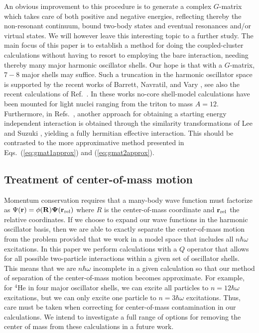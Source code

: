 \documentclass[aps,prc,twocolumn,floatfix]{revtex4}
\begin{document}
An obvious improvement to this procedure is to generate a complex $G$-matrix which takes care
of both positive and negative energies, reflecting thereby the non-resonant continuum, bound two-body
states and eventual resonances and/or virtual states. We will however leave this interesting topic
to a further study. The main focus of this paper is to establish a method for doing
the coupled-cluster calculations without having to resort to employing the bare interaction,
needing thereby  many major harmonic oscillator shells. Our hope is that with a $G$-matrix, 
$7-8$ major shells may suffice. 
Such a truncation in the harmonic oscillator space is supported by the recent works of
Barrett, Navratil, and Vary \cite{bruce1,bruce2,bruce3}, 
see also the recent calculations
of Ref.~\cite{petr_erich02}. In these works no-core shell-model calculations have 
been mounted
for light nuclei ranging from the triton to mass $A=12$. 
Furthermore, in Refs.~\cite{bruce1,bruce2},
another approach for obtaining a starting energy independent interaction is obtained through
the similarity transformations of Lee and Suzuki \cite{ls0,ls1}, 
yielding a fully hermitian
effective interaction. This should be contrasted to the more 
approximative method presented 
in Eqs.~(\ref{eq:gmat1approx}) and (\ref{eq:gmat2approx}).


\subsection{Treatment of center-of-mass motion}

Momentum conservation requires 
that a many-body wave function must factorize
as $\Psi(\bf{r}) = \phi(R)\Psi(\bf{r}_{\rm rel})$ where 
$R$ is the center-of-mass coordinate and $\bf{r}_{\rm rel}$ the 
relative coordinates. If we choose to expand our wave functions in
the harmonic oscillator basis, then we are able to exactly separate the
center-of-mass motion from the problem provided that we work in a model
space that includes all $n\hbar\omega$ excitations. 
In this paper we perform calculations with a $Q$ operator that allows 
for all possible two-particle interactions within a given 
set of oscillator shells.  This means that we are 
$n\hbar\omega$ incomplete in a given 
calculation so that our method of separation of the center-of-mass 
motion becomes approximate. For example, for $^4$He in four major oscillator
shells, we can excite all particles to $n=12\hbar\omega$ excitations, 
but we can only excite one particle to $n=3\hbar\omega$ excitations. 
Thus, care must be taken when correcting for center-of-mass contamination
in our calculations. We intend to investigate a full range of 
options for removing the center of mass from these calculations in
a future work. 
\end{document}
